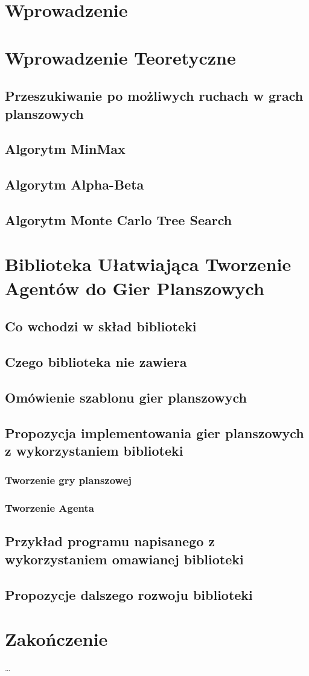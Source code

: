 \documentclass[declaration,shortabstract,inz]{iithesis}
\author         {Mikołaj Kowalik}
\begin{document}

\chapter{Wprowadzenie}
\chapter{Wprowadzenie Teoretyczne}
\section{Przeszukiwanie po możliwych ruchach w grach planszowych}
\section{Algorytm MinMax}
\section{Algorytm Alpha-Beta}
\section{Algorytm Monte Carlo Tree Search}
\chapter{Biblioteka Ułatwiająca Tworzenie Agentów do Gier Planszowych}
\section{Co wchodzi w skład biblioteki}
\section{Czego biblioteka nie zawiera}
\section{Omówienie szablonu gier planszowych}
\section{Propozycja implementowania gier planszowych z wykorzystaniem biblioteki}
\subsection{Tworzenie gry planszowej}
\subsection{Tworzenie Agenta}
\section{Przykład programu napisanego z wykorzystaniem omawianej biblioteki}
\section{Propozycje dalszego rozwoju biblioteki}
\chapter{Zakończenie}
\ldots


\end{document}
